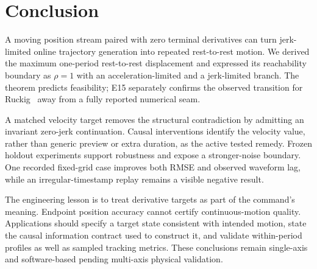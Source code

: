 \section{Conclusion}
\label{sec:conclusion}

A moving position stream paired with zero terminal derivatives can turn jerk-limited online trajectory generation into repeated rest-to-rest motion. We derived the maximum one-period rest-to-rest displacement and expressed its reachability boundary as $\rho=1$ with an acceleration-limited and a jerk-limited branch. The theorem predicts feasibility; E15 separately confirms the observed transition for Ruckig~\RuckigVersion{} away from a fully reported numerical seam.

A matched velocity target removes the structural contradiction by admitting an invariant zero-jerk continuation. Causal interventions identify the velocity value, rather than generic preview or extra duration, as the active tested remedy. Frozen holdout experiments support robustness \testedEnvelope{} and expose a stronger-noise boundary. One recorded fixed-grid case improves both RMSE and observed waveform lag, while an irregular-timestamp replay remains a visible negative result.

The engineering lesson is to treat derivative targets as part of the command's meaning. Endpoint position accuracy cannot certify continuous-motion quality. Applications should specify a target state consistent with intended motion, state the causal information contract used to construct it, and validate within-period profiles as well as sampled tracking metrics. These conclusions remain single-axis and software-based pending multi-axis physical validation.

